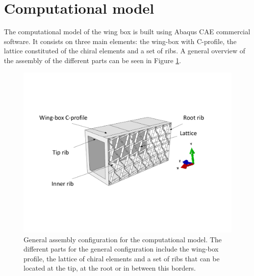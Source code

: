 \section{Computational model} \label{sec:computationalModel}

  The computational model of the wing box is built using Abaqus CAE commercial software. It consists on three main elements: the wing-box with C-profile, the lattice constituted of the chiral elements and a set of ribs. A general overview of the assembly of the different parts can be seen in Figure \ref{fig:all-assembly}.

  \begin{figure}[!htpb]
    \centering
    \includegraphics[width=0.8 \textwidth]{figures/model/all-assembly}
    \caption[General assembly configuration for the computational model]{General assembly configuration for the computational model. The different parts for the general configuration include the wing-box profile, the lattice of chiral elements and a set of ribs that can be located at the tip, at the root or in between this borders.}\label{fig:all-assembly}
  \end{figure}

